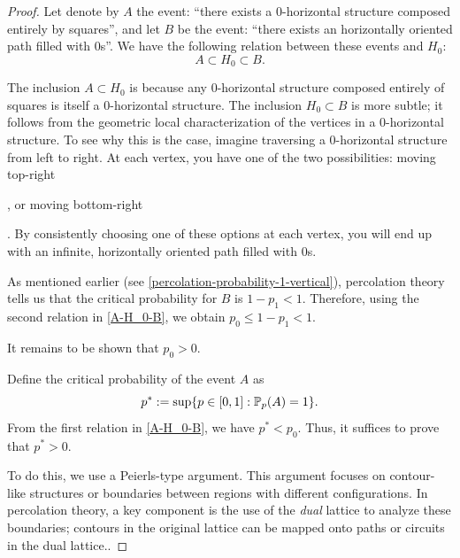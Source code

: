         \begin{proof}
           Let denote by $A$ the event: ``there exists a 0-horizontal structure composed entirely by squares'', and let $B$ be the event: ``there exists an horizontally oriented path filled with 0s''. We have the following relation between these events and $H_0$:
           \begin{equation}\label{A-H_0-B}
                A \subset H_0 \subset B.
           \end{equation}

           The inclusion $A \subset H_0$ is because any 0-horizontal structure composed entirely of squares is itself a 0-horizontal structure. The inclusion $H_0 \subset B$ is more subtle; it follows from the geometric local characterization of the vertices in a 0-horizontal structure. To see why this is the case, imagine traversing a 0-horizontal structure from left to right. At each vertex, you have one of the two possibilities: moving top-right 
           , or moving bottom-right 
           . By consistently choosing one of these options at each vertex, you will end up with an infinite, horizontally oriented path filled with 0s.

           As mentioned earlier (see \eqref{percolation-probability-1-vertical}), percolation theory tells us that the critical probability for $B$ is $1 - p_1 < 1$. Therefore, using the second relation in \eqref{A-H_0-B}, we obtain $p_0 \leq 1-p_1 < 1$. 

           It remains to be shown that $p_0 > 0$. 

           Define the critical probability of the event $A$ as 
           $$
                p^* := \sup\{p \in [0, 1] : \mathbb{P}_p(A) = 1\}.
           $$ 
           From the first relation in \eqref{A-H_0-B}, we have $p^* < p_0$. Thus, it suffices to prove that $p^* > 0$. 

           To do this, we use a Peierls-type argument. This argument focuses on contour-like structures or boundaries between regions with different configurations. In percolation theory, a key component is the use of the \emph{dual} lattice to analyze these boundaries; contours in the original lattice can be mapped onto paths or circuits in the dual lattice..


\end{proof}
